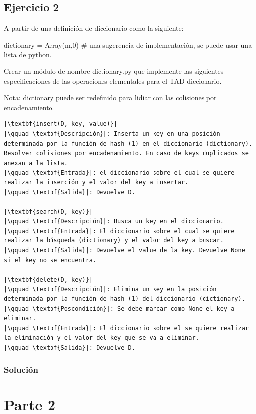 \documentclass{article}
\begin{document}
\pagebreak
\subsection*{Ejercicio 2}
A partir de una definición de diccionario como la siguiente:

dictionary = Array(m,0) \# una sugerencia de implementación, se puede usar una lista de python.

Crear un módulo de nombre dictionary.py que implemente las siguientes especificaciones de las operaciones elementales para el TAD diccionario.

Nota: dictionary puede ser redefinido para lidiar con las colisiones por encadenamiento.

\begin{lstlisting}
|\textbf{insert(D, key, value)}|
|\qquad \textbf{Descripción}|: Inserta un key en una posición determinada por la función de hash (1) en el diccionario (dictionary). Resolver colisiones por encadenamiento. En caso de keys duplicados se anexan a la lista.
|\qquad \textbf{Entrada}|: el diccionario sobre el cual se quiere realizar la inserción y el valor del key a insertar.        
|\qquad \textbf{Salida}|: Devuelve D.

|\textbf{search(D, key)}|
|\qquad \textbf{Descripción}|: Busca un key en el diccionario.
|\qquad \textbf{Entrada}|: El diccionario sobre el cual se quiere realizar la búsqueda (dictionary) y el valor del key a buscar.
|\qquad \textbf{Salida}|: Devuelve el value de la key. Devuelve None si el key no se encuentra.        

|\textbf{delete(D, key)}|
|\qquad \textbf{Descripción}|: Elimina un key en la posición determinada por la función de hash (1) del diccionario (dictionary).
|\qquad \textbf{Poscondición}|: Se debe marcar como None el key a eliminar.
|\qquad \textbf{Entrada}|: El diccionario sobre el se quiere realizar la eliminación y el valor del key que se va a eliminar.
|\qquad \textbf{Salida}|: Devuelve D.
\end{lstlisting}
\subsubsection*{Solución}
\pagebreak
{}


\section*{Parte 2}
\end{document}
